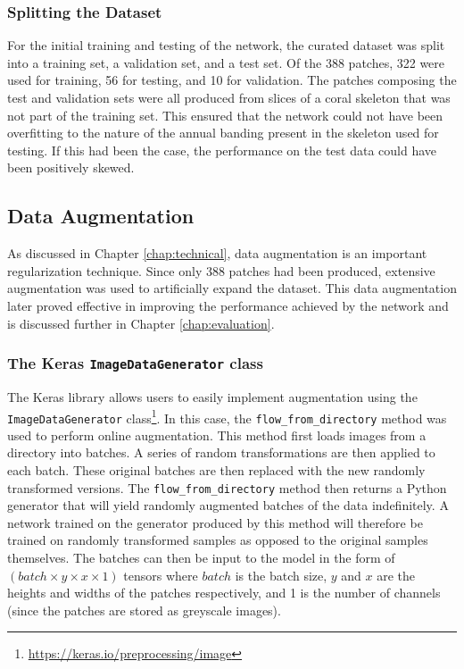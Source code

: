 \subsubsection{Splitting the Dataset}

For the initial training and testing of the network, the curated dataset was split into a training set, a validation set, and a test set. Of the 388 patches, 322 were used for training, 56 for testing, and 10 for validation. The patches composing the test and validation sets were all produced from slices of a coral skeleton that was not part of the training set. This ensured that the network could not have been overfitting to the nature of the annual banding present in the skeleton used for testing. If this had been the case, the performance on the test data could have been positively skewed.

\subsection{Data Augmentation}

As discussed in Chapter \ref{chap:technical}, data augmentation is an important regularization technique. Since only 388 patches had been produced, extensive augmentation was used to artificially expand the dataset. This data augmentation later proved effective in improving the performance achieved by the network and is discussed further in Chapter \ref{chap:evaluation}.

\subsubsection{The Keras \texttt{ImageDataGenerator} class}

The Keras library allows users to easily implement augmentation using the \texttt{ImageDataGenerator} class\footnote{\url{https://keras.io/preprocessing/image}}. In this case, the \texttt{flow\_from\_directory} method was used to perform online augmentation. This method first loads images from a directory into batches. A series of random transformations are then applied to each batch. These original batches are then replaced with the new randomly transformed versions. The \texttt{flow\_from\_directory} method then returns a Python generator that will yield randomly augmented batches of the data indefinitely. A network trained on the generator produced by this method will therefore be trained on randomly transformed samples as opposed to the original samples themselves. The batches can then be input to the model in the form of $(batch \times y \times x \times 1)$ tensors where $batch$ is the batch size, $y$ and $x$ are the heights and widths of the patches respectively, and 1 is the number of channels (since the patches are stored as greyscale images).

